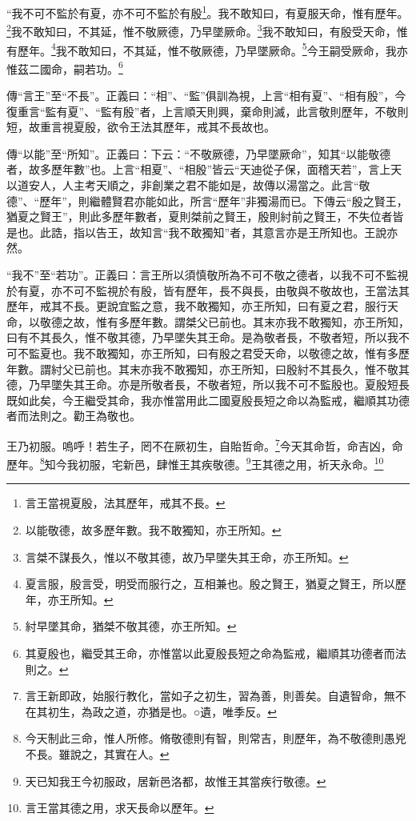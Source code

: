 “我不可不監於有夏，亦不可不監於有殷\footnote{言王當視夏殷，法其歷年，戒其不長。}。我不敢知曰，有夏服天命，惟有歷年。\footnote{以能敬德，故多歷年數。我不敢獨知，亦王所知。}我不敢知曰，不其延，惟不敬厥德，乃早墜厥命。\footnote{言桀不謀長久，惟以不敬其德，故乃早墜失其王命，亦王所知。}我不敢知曰，有殷受天命，惟有歷年。\footnote{夏言服，殷言受，明受而服行之，互相兼也。殷之賢王，猶夏之賢王，所以歷年，亦王所知。}我不敢知曰，不其延，惟不敬厥德，乃早墜厥命。\footnote{紂早墜其命，猶桀不敬其德，亦王所知。}今王嗣受厥命，我亦惟茲二國命，嗣若功。\footnote{其夏殷也，繼受其王命，亦惟當以此夏殷長短之命為監戒，繼順其功德者而法則之。}


{\noindent\zhuan{}\fzbyks 傳“言王”至“不長”。正義曰：“相”、“監”俱訓為視，上言“相有夏”、“相有殷”，今復重言“監有夏”、“監有殷”者，上言順天則興，棄命則滅，此言敬則歷年，不敬則短，故重言視夏殷，欲令王法其歷年，戒其不長故也。 \par}

{\noindent\zhuan{}\fzbyks 傳“以能”至“所知”。正義曰：下云：“不敬厥德，乃早墜厥命”，知其“以能敬德者，故多歷年數”也。上言“相夏”、“相殷”皆云“天迪從子保，面稽天若”，言上天以道安人，人主考天順之，非創業之君不能如是，故傳以湯當之。此言“敬德”、“歷年”，則繼體賢君亦能如此，所言“歷年”非獨湯而已。下傳云“殷之賢王，猶夏之賢王”，則此多歷年數者，夏則桀前之賢王，殷則紂前之賢王，不失位者皆是也。此誥，指以告王，故知言“我不敢獨知”者，其意言亦是王所知也。王說亦然。 \par}

{\noindent\shu{}\fzkt “我不”至“若功”。正義曰：言王所以須慎敬所為不可不敬之德者，以我不可不監視於有夏，亦不可不監視於有殷，皆有歷年，長不與長，由敬與不敬故也，王當法其歷年，戒其不長。更說宜監之意，我不敢獨知，亦王所知，曰有夏之君，服行天命，以敬德之故，惟有多歷年數。謂桀父已前也。其末亦我不敢獨知，亦王所知，曰有不其長久，惟不敬其德，乃早墜失其王命。是為敬者長，不敬者短，所以我不可不監夏也。我不敢獨知，亦王所知，曰有殷之君受天命，以敬德之故，惟有多歷年數。謂紂父已前也。其末亦我不敢獨知，亦王所知，曰殷紂不其長久，惟不敬其德，乃早墜失其王命。亦是所敬者長，不敬者短，所以我不可不監殷也。夏殷短長既如此矣，今王繼受其命，我亦惟當用此二國夏殷長短之命以為監戒，繼順其功德者而法則之。勸王為敬也。 \par}

王乃初服。嗚呼！若生子，罔不在厥初生，自貽哲命。\footnote{言王新即政，始服行教化，當如子之初生，習為善，則善矣。自遺智命，無不在其初生，為政之道，亦猶是也。○遺，唯季反。}今天其命哲，命吉凶，命歷年。\footnote{今天制此三命，惟人所修。脩敬德則有智，則常吉，則歷年，為不敬德則愚兇不長。雖說之，其實在人。}知今我初服，宅新邑，肆惟王其疾敬德。\footnote{天已知我王今初服政，居新邑洛都，故惟王其當疾行敬德。}王其德之用，祈天永命。\footnote{言王當其德之用，求天長命以歷年。}


